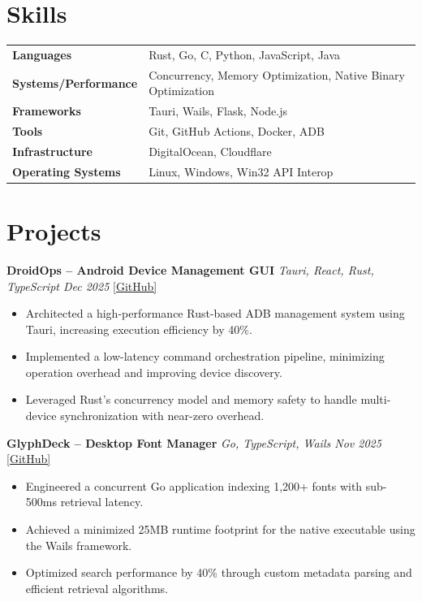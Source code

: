 \documentclass[10pt, a4paper]{article}
\begin{document}
\section*{Skills}

\renewcommand{\arraystretch}{1.05}
\begin{tabular}{@{} >{\bfseries}p{3.8cm} p{13cm} @{}}
Languages           & Rust, Go, C, Python, JavaScript, Java \\
Systems/Performance & Concurrency, Memory Optimization, Native Binary Optimization \\
Frameworks          & Tauri, Wails, Flask, Node.js \\
Tools               & Git, GitHub Actions, Docker, ADB \\
Infrastructure      & DigitalOcean, Cloudflare \\
Operating Systems   & Linux, Windows, Win32 API Interop \\
\end{tabular}

\section*{Projects}

\textbf{DroidOps -- Android Device Management GUI} \hfill \textit{Tauri, React, Rust, TypeScript \quad Dec 2025} \quad \href{https://github.com/bbinxx/droidops}{[GitHub]}
\begin{itemize}
\item Architected a high-performance Rust-based ADB management system using Tauri, increasing execution efficiency by 40\%.
\item Implemented a low-latency command orchestration pipeline, minimizing operation overhead and improving device discovery.
\item Leveraged Rust's concurrency model and memory safety to handle multi-device synchronization with near-zero overhead.
\end{itemize}

\vspace{3pt}

\textbf{GlyphDeck -- Desktop Font Manager} \hfill \textit{Go, TypeScript, Wails \quad Nov 2025} \quad \href{https://github.com/bbinxx/GlyphDeck}{[GitHub]}
\begin{itemize}
\item Engineered a concurrent Go application indexing 1,200+ fonts with sub-500ms retrieval latency.
\item Achieved a minimized 25MB runtime footprint for the native executable using the Wails framework.
\item Optimized search performance by 40\% through custom metadata parsing and efficient retrieval algorithms.
\end{itemize}
\end{document}
